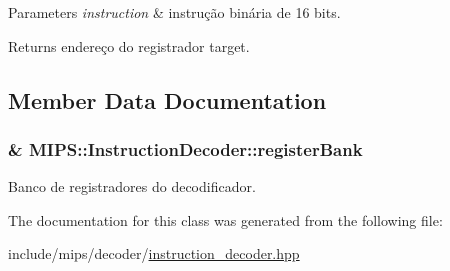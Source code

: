 \begin{DoxyParams}{Parameters}
{\em instruction} & instrução binária de 16 bits. \\
\hline
\end{DoxyParams}
\begin{DoxyReturn}{Returns}
endereço do registrador target. 
\end{DoxyReturn}


\subsection{Member Data Documentation}
\subsubsection[{\texorpdfstring{register\+Bank}{registerBank}}]{\& M\+I\+P\+S\+::\+Instruction\+Decoder\+::register\+Bank\hspace{0.3cm}{\ttfamily [protected]}}\hypertarget{classMIPS_1_1InstructionDecoder_a6796453642fca3384868a9539656ab45}{}\label{classMIPS_1_1InstructionDecoder_a6796453642fca3384868a9539656ab45}
Banco de registradores do decodificador. 

The documentation for this class was generated from the following file\+:\begin{DoxyCompactItemize}
\item 
include/mips/decoder/\hyperlink{instruction__decoder_8hpp}{instruction\+\_\+decoder.\+hpp}\end{DoxyCompactItemize}
